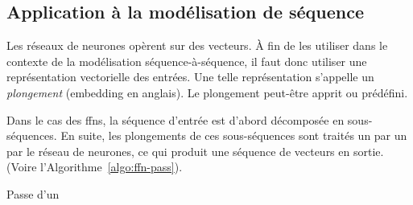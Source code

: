 \subsection{Application à la modélisation de séquence}

Les réseaux de neurones opèrent sur des vecteurs.
À fin de les utiliser dans le contexte de la modélisation séquence-à-séquence, 
il faut donc utiliser une représentation vectorielle des entrées.
Une telle représentation s'appelle un \emph{plongement} (\foreignlanguage{english}{embedding} en anglais).
Le plongement peut-être apprit ou prédéfini.

Dans le cas des \glspl{ffn}, la séquence d'entrée est d'abord décomposée en sous-séquences.
En suite, les plongements de ces sous-séquences sont traités un par un par le réseau de neurones,
ce qui produit une séquence de vecteurs en sortie.
(Voire l'Algorithme~\ref{algo:ffn-pass}).

\begin{algorithm}[htb]
    \caption{Passe d'un }
    \label{algo:ffn-pass}
\end{algorithm}
